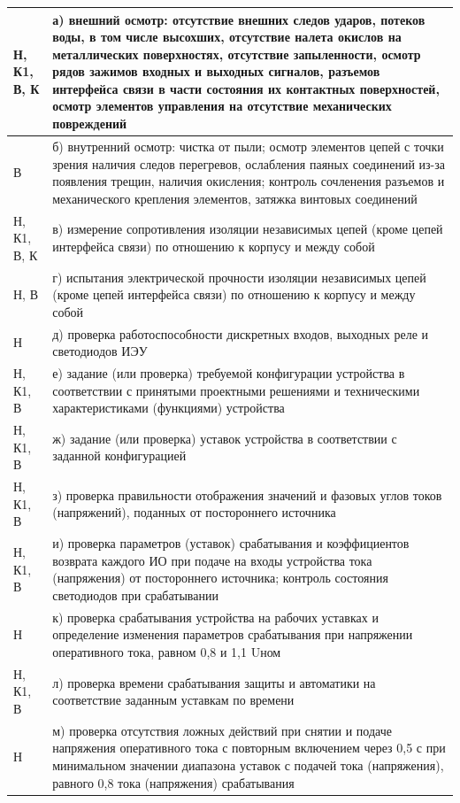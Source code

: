 \begin{longtable}{
  |>{\raggedright\arraybackslash}m{2cm}
  |>{\raggedright\arraybackslash}m{14.8cm}|
}
Н, К1, В, К & а) внешний осмотр: отсутствие внешних следов ударов, потеков воды, в том числе высохших, отсутствие налета окислов на металлических поверхностях, отсутствие запыленности, осмотр рядов зажимов входных и выходных сигналов, разъемов интерфейса связи в части состояния их контактных поверхностей, осмотр элементов управления на отсутствие механических повреждений \\ \hline
		  В & б) внутренний осмотр: чистка от пыли; осмотр элементов цепей с точки зрения наличия следов перегревов, ослабления паяных соединений из-за появления трещин, наличия окисления; контроль сочленения разъемов и механического крепления элементов, затяжка винтовых соединений \\ \hline
Н, К1, В, К & в) измерение сопротивления изоляции независимых цепей (кроме цепей интерфейса связи) по отношению к корпусу и между собой \\ \hline
	   Н, В & г) испытания электрической прочности изоляции независимых цепей (кроме цепей интерфейса связи) по отношению к корпусу и между собой \\ \hline
          Н & д) проверка работоспособности дискретных входов, выходных реле и светодиодов ИЭУ \\ \hline
   Н, К1, В & е) задание (или проверка) требуемой конфигурации устройства в соответствии с принятыми проектными решениями и техническими характеристиками (функциями) устройства \\ \hline
   Н, К1, В & ж) задание (или проверка) уставок устройства в соответствии с заданной конфигурацией \\ \hline
   Н, К1, В & з) проверка правильности отображения значений и фазовых углов токов (напряжений), поданных от постороннего источника \\ \hline
   Н, К1, В & и) проверка параметров (уставок) срабатывания и коэффициентов возврата каждого ИО при подаче на входы устройства тока (напряжения) от постороннего источника; контроль состояния светодиодов при срабатывании \\ \hline
          Н & к) проверка срабатывания устройства на рабочих уставках и определение изменения параметров срабатывания при напряжении оперативного тока, равном 0,8 и 1,1 Uном \\ \hline
   Н, К1, В & л) проверка времени срабатывания защиты и автоматики на соответствие заданным уставкам по времени \\ \hline
          Н & м) проверка отсутствия ложных действий при снятии и подаче напряжения оперативного тока с повторным включением через 0,5 с при минимальном значении диапазона уставок с подачей тока (напряжения), равного 0,8 тока (напряжения) срабатывания \\ \hline

\end{longtable}
